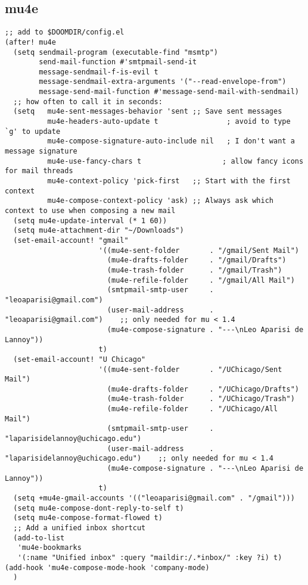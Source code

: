 \documentclass[c]{article}
\theoremstyle{plain}%
\theoremstyle{definition}
\theoremstyle{remark}
\begin{document}
\subsection{mu4e}
\label{sec:orga3032b6}
\begin{verbatim}
;; add to $DOOMDIR/config.el
(after! mu4e
  (setq sendmail-program (executable-find "msmtp")
        send-mail-function #'smtpmail-send-it
        message-sendmail-f-is-evil t
        message-sendmail-extra-arguments '("--read-envelope-from")
        message-send-mail-function #'message-send-mail-with-sendmail)
  ;; how often to call it in seconds:
  (setq   mu4e-sent-messages-behavior 'sent ;; Save sent messages
          mu4e-headers-auto-update t                ; avoid to type `g' to update
          mu4e-compose-signature-auto-include nil   ; I don't want a message signature
          mu4e-use-fancy-chars t                   ; allow fancy icons for mail threads
          mu4e-context-policy 'pick-first   ;; Start with the first context
          mu4e-compose-context-policy 'ask) ;; Always ask which context to use when composing a new mail
  (setq mu4e-update-interval (* 1 60))
  (setq mu4e-attachment-dir "~/Downloads")
  (set-email-account! "gmail"
                      '((mu4e-sent-folder       . "/gmail/Sent Mail")
                        (mu4e-drafts-folder     . "/gmail/Drafts")
                        (mu4e-trash-folder      . "/gmail/Trash")
                        (mu4e-refile-folder     . "/gmail/All Mail")
                        (smtpmail-smtp-user     . "leoaparisi@gmail.com")
                        (user-mail-address      . "leoaparisi@gmail.com")    ;; only needed for mu < 1.4
                        (mu4e-compose-signature . "---\nLeo Aparisi de Lannoy"))
                      t)
  (set-email-account! "U Chicago"
                      '((mu4e-sent-folder       . "/UChicago/Sent Mail")
                        (mu4e-drafts-folder     . "/UChicago/Drafts")
                        (mu4e-trash-folder      . "/UChicago/Trash")
                        (mu4e-refile-folder     . "/UChicago/All Mail")
                        (smtpmail-smtp-user     . "laparisidelannoy@uchicago.edu")
                        (user-mail-address      . "laparisidelannoy@uchicago.edu")    ;; only needed for mu < 1.4
                        (mu4e-compose-signature . "---\nLeo Aparisi de Lannoy"))
                      t)
  (setq +mu4e-gmail-accounts '(("leoaparisi@gmail.com" . "/gmail")))
  (setq mu4e-compose-dont-reply-to-self t)
  (setq mu4e-compose-format-flowed t)
  ;; Add a unified inbox shortcut
  (add-to-list
   'mu4e-bookmarks
   '(:name "Unified inbox" :query "maildir:/.*inbox/" :key ?i) t)
(add-hook 'mu4e-compose-mode-hook 'company-mode)
  )
\end{verbatim}
\end{document}
